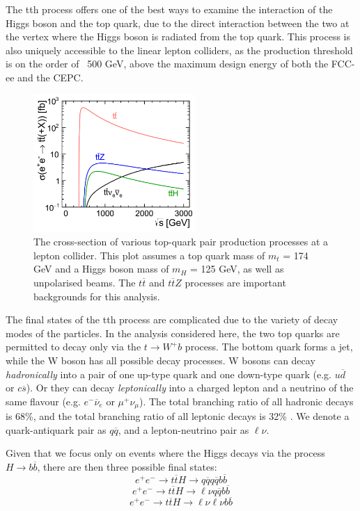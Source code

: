 The tth process offers one of the best ways to examine the interaction of the Higgs boson and the top quark, due to the direct interaction between the two at the vertex where the Higgs boson is radiated from the top quark. This process is also uniquely accessible to the linear lepton colliders, as the production threshold is on the order of ~500 GeV, above the maximum design energy of both the \acrshort{FCC}-ee and the \acrshort{CEPC}.

\begin{figure}[h]
	\centering
	\includegraphics[width=0.55\textwidth]{../Pictures/Analysis/tt-production-crosssection.png}
	\caption{The cross-section of various top-quark pair production processes at a lepton collider. This plot assumes a top quark mass of $m_t$ = 174 GeV and a Higgs boson mass of $m_H$ = 125 GeV, as well as unpolarised beams. The $t\overline{t}$ and $t\overline{t}Z$ processes are important backgrounds for this analysis.}
	\label{figure:analysis/top-quark-plot}
\end{figure}

The final states of the tth process are complicated due to the variety of decay modes of the particles. In the analysis considered here, the two top quarks are permitted to decay only via the $t \rightarrow W^+ b $ process. The bottom quark forms a jet, while the W boson has all possible decay processes. W bosons can decay \textit{hadronically} into a pair of one up-type quark and one down-type quark (e.g. $u\overline{d}$ or $c\overline{s}$). Or they can decay \textit{leptonically} into a charged lepton and a neutrino of the same flavour (e.g. $e^- \overline{\nu}_e$ or $\mu^+ \nu_\mu$). The total branching ratio of all hadronic decays is 68\%, and the total branching ratio of all leptonic decays is 32\% \cite{pdg-review}. We denote a quark-antiquark pair as $q\overline{q}$, and a lepton-neutrino pair as $\ell \nu$.

Given that we focus only on events where the Higgs decays via the process $H \rightarrow b\overline{b}$, there are then three possible final states: %
$$e^+ e^- \rightarrow t\overline{t}H \rightarrow q\overline{q}q\overline{q}b\overline{b}$$
$$e^+ e^- \rightarrow t\overline{t}H \rightarrow \ell \nu q \overline{q} b \overline{b}$$
$$e^+ e^- \rightarrow t\overline{t}H \rightarrow \ell \nu \ell \nu b \overline{b}$$

